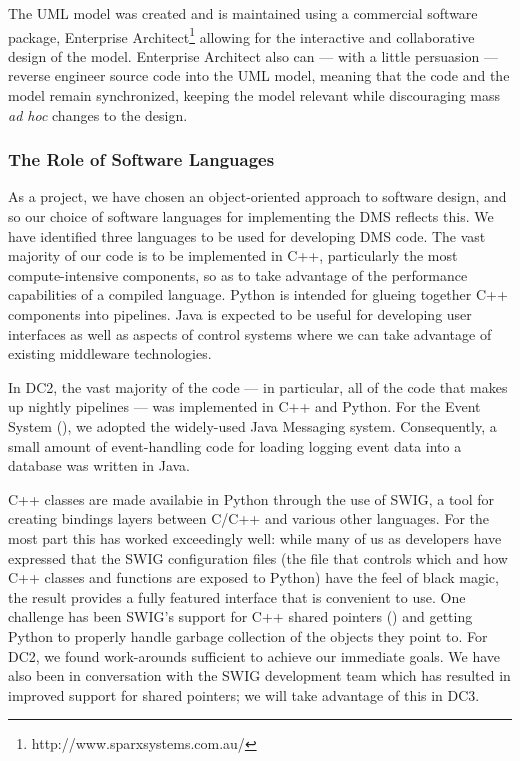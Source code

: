 The UML model was created and is maintained using a commercial software package,
Enterprise Architect\footnote{http://www.sparxsystems.com.au/} allowing for the
interactive and collaborative design of the model. Enterprise Architect also can
 --- with a little persuasion --- reverse engineer source code into the UML
model, meaning that the code and the model remain synchronized, keeping the
model relevant while discouraging mass \textit{ad hoc} changes to the design.

\subsubsection{The Role of Software Languages}

As a project, we have chosen an object-oriented approach to software
design, and so our choice of software languages for implementing the
DMS reflects this.  We have identified three languages to be used for
developing DMS code.  The vast majority of our code is to be
implemented in C++, particularly the most compute-intensive
components, so as to take advantage of the performance capabilities of
a compiled language.  Python is intended for glueing together C++
components into pipelines.  Java is expected to be useful for
developing user interfaces as well as aspects of control systems where
we can take advantage of existing middleware technologies.  

In DC2, the vast majority of the code --- in particular, all of the code
that makes up nightly pipelines --- was implemented in C++ and Python.
For the Event System (), we adopted the widely-used Java
Messaging system.  Consequently, a small amount of event-handling code
for loading logging event data into a database was written in Java.

C++ classes are made availabie in Python through the use of SWIG, a
tool for creating bindings layers between C/C++ and various other
languages.  For the most part this has worked exceedingly well:  while
many of us as developers have expressed that the SWIG configuration
files (the file that controls which and how C++ classes and functions
are exposed to Python) have the feel of black magic, the result
provides a fully featured interface that is convenient to use.  One
challenge has been SWIG's support for C++ shared pointers
() and getting Python to properly handle
garbage collection of the objects they point to.  For DC2, we found
work-arounds sufficient to achieve our immediate goals.  We have also
been in conversation with the SWIG development team which has resulted
in improved support for shared pointers; we will take advantage of
this in DC3.  
  
